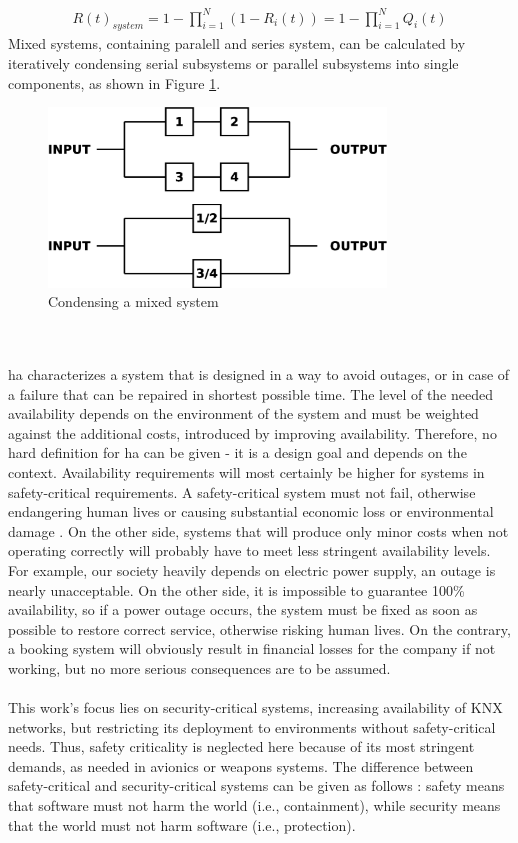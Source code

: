 \begin{align}\label{parallelSysEqu}
 R(t)_{system} = 1 - \prod_{i=1}^{N} (1- R_{i}(t)) = 1 - \prod_{i=1}^{N} Q_{i}(t)
\end{align}
Mixed systems, containing paralell and series system, can be calculated by iteratively condensing serial subsystems or parallel subsystems into single components,
as shown in Figure \ref{fig:mixedSys}.
\begin{figure}
    \centering
    \includegraphics[width=0.8\textwidth]{figures/mixedSys.eps}
    \caption{Condensing a mixed system}
    \label{fig:mixedSys}
\end{figure}
\\
\\
\gls{ha} characterizes a system that is designed in a way to avoid outages, or in case of a failure that can be repaired in shortest possible time. 
The level of the needed availability depends on the environment of the system and must be weighted against the additional costs, introduced by improving availability.
Therefore, no hard definition for \gls{ha} can be given - it is a design goal and depends on the context. Availability requirements will most certainly be higher
for systems in safety-critical requirements. A safety-critical system must not fail, otherwise endangering human lives or 
causing substantial economic loss or environmental damage \cite{1007998}.
On the other side, systems that will produce only minor costs when not operating correctly
will probably have to meet less stringent availability levels.
\\
For example, our society heavily depends on electric power supply, an outage
is nearly unacceptable. On the other side, it is impossible to guarantee 100\% availability, so if a power outage occurs, the system must be fixed as soon as
possible to restore correct service, otherwise risking human lives. On the contrary, a booking system will obviously result in financial losses for the company 
if not working, but no more serious consequences are to be assumed.
\\
\\
This work's focus lies on security-critical systems, increasing availability of KNX networks, but restricting its
deployment to environments without safety-critical needs. Thus, safety criticality is neglected here because of its most stringent demands, as needed in
avionics or weapons systems.
The difference between safety-critical and security-critical systems can be given as follows \cite{5784222}: safety means that software must not harm the 
world (i.e., containment), while security means that the world must not harm software (i.e., protection).

